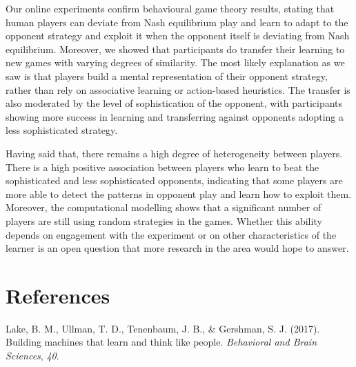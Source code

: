 \documentclass[man,floatsintext]{apa6}
\begin{document}
Our online experiments confirm behavioural game theory results, stating that human players can deviate from Nash equilibrium play and learn to adapt to the opponent strategy and exploit it when the opponent itself is deviating from Nash equilibrium. Moreover, we showed that participants do transfer their learning to new games with varying degrees of similarity. The most likely explanation as we saw is that players build a mental representation of their opponent strategy, rather than rely on associative learning or action-based heuristics. The transfer is also moderated by the level of sophistication of the opponent, with participants showing more success in learning and transferring against opponents adopting a less sophisticated strategy.

Having said that, there remains a high degree of heterogeneity between players. There is a high positive association between players who learn to beat the sophisticated and less sophisticated opponents, indicating that some players are more able to detect the patterns in opponent play and learn how to exploit them. Moreover, the computational modelling shows that a significant number of players are still using random strategies in the games. Whether this ability depends on engagement with the experiment or on other characteristics of the learner is an open question that more research in the area would hope to answer.

\newpage

\hypertarget{references}{%
\section{References}\label{references}}

\begingroup
\setlength{\parindent}{-0.5in}
\setlength{\leftskip}{0.5in}

\hypertarget{refs}{}
\leavevmode\hypertarget{ref-lake2017building}{}%
Lake, B. M., Ullman, T. D., Tenenbaum, J. B., \& Gershman, S. J. (2017). Building machines that learn and think like people. \emph{Behavioral and Brain Sciences}, \emph{40}.

\endgroup
\end{document}
